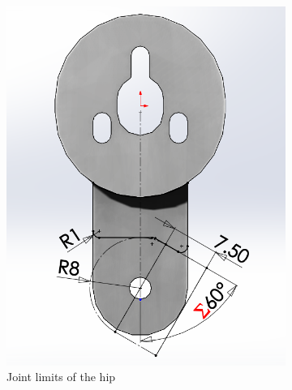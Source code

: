 \begin{figure}[ht!]
    \centering
    \begin{subfigure}[b]{0.49\textwidth}
        \includegraphics[width=\textwidth]{figures/joint_limits_hip.PNG}
        \caption{Joint limits of the hip}
        \label{fig:joint_limits_hip}
    \end{subfigure}
    \begin{subfigure}[b]{0.49\textwidth}

\end{subfigure}
\end{figure}
